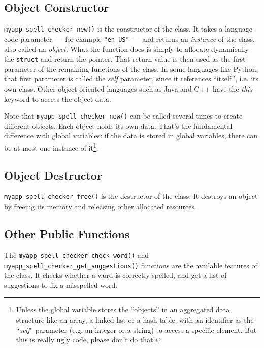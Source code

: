 \subsection{Object Constructor}
\lstinline{myapp_spell_checker_new()} is the constructor of the class. It takes a language code parameter ---~for example \lstinline{"en_US"}~--- and returns an \emph{instance} of the class, also called an \emph{object}. What the function does is simply to allocate dynamically the \lstinline{struct} and return the pointer. That return value is then used as the first parameter of the remaining functions of the class. In some languages like Python, that first parameter is called the \emph{self} parameter, since it references ``itself'', i.e. its own class. Other object-oriented languages such as Java and C++ have the \emph{this} keyword to access the object data.

Note that \lstinline{myapp_spell_checker_new()} can be called several times to create different objects. Each object holds its own data. That's the fundamental difference with global variables: if the data is stored in global variables, there can be at most one instance of it\footnote{Unless the global variable stores the ``objects'' in an aggregated data structure like an array, a linked list or a hash table, with an identifier as the ``\emph{self}'' parameter (e.g. an integer or a string) to access a specific element. But this is really ugly code, please don't do that!}.


\subsection{Object Destructor}
\lstinline{myapp_spell_checker_free()} is the destructor of the class. It destroys an object by freeing its memory and releasing other allocated resources.

\subsection{Other Public Functions}
The \lstinline{myapp_spell_checker_check_word()} and \lstinline{myapp_spell_checker_get_suggestions()} functions are the available features of the class. It checks whether a word is correctly spelled, and get a list of suggestions to fix a misspelled word.

